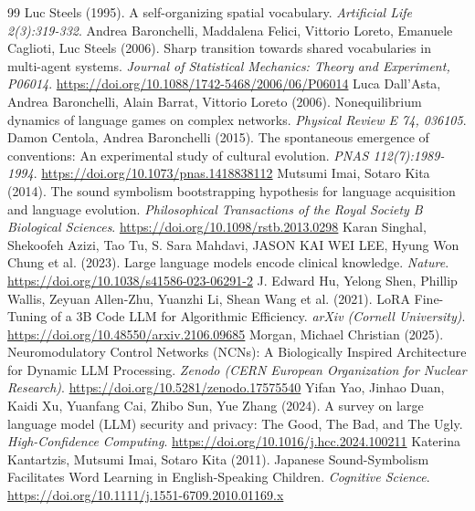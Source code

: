 \documentclass[11pt,a4paper]{article}
\begin{document}
\begin{thebibliography}{99}
 Luc Steels (1995). A self-organizing spatial vocabulary. \emph{Artificial Life 2(3):319-332}.
 Andrea Baronchelli, Maddalena Felici, Vittorio Loreto, Emanuele Caglioti, Luc Steels (2006). Sharp transition towards shared vocabularies in multi-agent systems. \emph{Journal of Statistical Mechanics: Theory and Experiment, P06014}. \url{https://doi.org/10.1088/1742-5468/2006/06/P06014}
 Luca Dall'Asta, Andrea Baronchelli, Alain Barrat, Vittorio Loreto (2006). Nonequilibrium dynamics of language games on complex networks. \emph{Physical Review E 74, 036105}.
 Damon Centola, Andrea Baronchelli (2015). The spontaneous emergence of conventions: An experimental study of cultural evolution. \emph{PNAS 112(7):1989-1994}. \url{https://doi.org/10.1073/pnas.1418838112}
 Mutsumi Imai, Sotaro Kita (2014). The sound symbolism bootstrapping hypothesis for language acquisition and language evolution. \emph{Philosophical Transactions of the Royal Society B Biological Sciences}. \url{https://doi.org/10.1098/rstb.2013.0298}
 Karan Singhal, Shekoofeh Azizi, Tao Tu, S. Sara Mahdavi, JASON KAI WEI LEE, Hyung Won Chung et al. (2023). Large language models encode clinical knowledge. \emph{Nature}. \url{https://doi.org/10.1038/s41586-023-06291-2}
 J. Edward Hu, Yelong Shen, Phillip Wallis, Zeyuan Allen-Zhu, Yuanzhi Li, Shean Wang et al. (2021). LoRA Fine-Tuning of a 3B Code LLM for Algorithmic Efficiency. \emph{arXiv (Cornell University)}. \url{https://doi.org/10.48550/arxiv.2106.09685}
 Morgan, Michael Christian (2025). Neuromodulatory Control Networks (NCNs): A Biologically Inspired Architecture for Dynamic LLM Processing. \emph{Zenodo (CERN European Organization for Nuclear Research)}. \url{https://doi.org/10.5281/zenodo.17575540}
 Yifan Yao, Jinhao Duan, Kaidi Xu, Yuanfang Cai, Zhibo Sun, Yue Zhang (2024). A survey on large language model (LLM) security and privacy: The Good, The Bad, and The Ugly. \emph{High-Confidence Computing}. \url{https://doi.org/10.1016/j.hcc.2024.100211}
 Katerina Kantartzis, Mutsumi Imai, Sotaro Kita (2011). Japanese Sound-Symbolism Facilitates Word Learning in English-Speaking Children. \emph{Cognitive Science}. \url{https://doi.org/10.1111/j.1551-6709.2010.01169.x}

\end{thebibliography}
\end{document}

